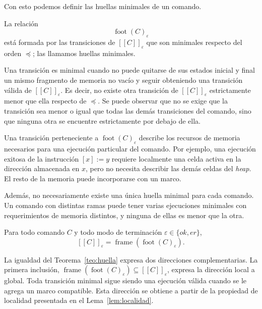 \documentclass[a4paper,	11pt]{report}
\newif\ifdraft\drafttrue
\newcommand{\comm}[3]{\ifdraft{{\color{#1}[#2: #3]}}\fi}
\newcommand{\guido}[1]{\comm{blue}{Guido}{#1}}
\begin{document}
Con esto podemos definir las huellas minimales de un comando.

\begin{definicion}
\label{def:huella-minima}
La relación
$$\operatorname{foot}(C)_\varepsilon$$
está formada por las transiciones de $[\![C]\!]_\varepsilon$ que son minimales respecto del orden $\preceq$;
las llamamos huellas minimales.
\end{definicion}

Una transición es minimal cuando no puede quitarse de sus estados inicial y final un mismo fragmento de memoria no vacío
y seguir obteniendo una transición válida de $[\![C]\!]_\varepsilon$.
Es decir,
no existe otra transición de $[\![C]\!]_\varepsilon$ estrictamente menor que ella respecto de $\preceq$.
Se puede observar que no se exige que la transición sea menor o igual que todas las demás transiciones del comando,
sino que ninguna otra se encuentre estrictamente por debajo de ella.

Una transición perteneciente a $\operatorname{foot}(C)_\varepsilon$
describe los recursos de memoria necesarios para una ejecución particular del comando.
Por ejemplo,
una ejecución exitosa de la instrucción $[x] := y$ requiere localmente una celda activa en la dirección almacenada en $x$,
pero no necesita describir las demás celdas del \emph{heap}.
El resto de la memoria puede incorporarse con un marco.

Además,
no necesariamente existe una única huella minimal para cada comando.
Un comando con distintas ramas puede tener varias ejecuciones minimales con requerimientos de memoria distintos,
y ninguna de ellas es menor que la otra.

\begin{teorema}
\label{teo:huella}
Para todo comando $C$ y todo modo de terminación $\varepsilon \in \{ok, er\}$,
$$[\![C]\!]_{\varepsilon} = \operatorname{frame}(\operatorname{foot}(C)_\varepsilon).$$
\end{teorema}

La igualdad del Teorema~\ref{teo:huella} expresa dos direcciones complementarias.
La primera inclusión,
$\operatorname{frame}(\operatorname{foot}(C)_\varepsilon) \subseteq [\![C]\!]_\varepsilon$,
expresa la dirección local a global.
Toda transición minimal sigue siendo una ejecución válida cuando se le agrega un marco compatible.
Esta dirección se obtiene a partir de la propiedad de localidad presentada en el Lema~\ref{lem:localidad}.
\end{document}
